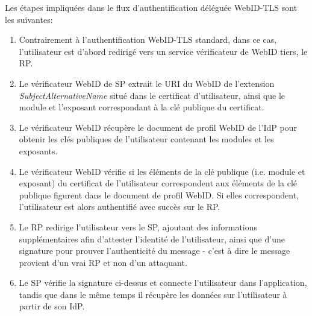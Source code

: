 \documentclass[a4paper]{article}
\begin{document}
Les étapes impliquées dans le flux d'authentification déléguée WebID-TLS sont les suivantes:\\

\begin{enumerate}
\item Contrairement à l'authentification WebID-TLS standard, dans ce cas, l'utilisateur est d'abord redirigé vers un service vérificateur de WebID tiers, le RP.
\item Le vérificateur WebID de SP extrait le URI du WebID de l'extension \textit{SubjectAlternativeName} situé dans le certificat d'utilisateur, ainsi que le module et l'exposant correspondant à la clé publique du certificat.
\item Le vérificateur WebID récupère le document de profil WebID de l'IdP pour obtenir les clés publiques de l'utilisateur contenant les modules et les exposants.
\item Le vérificateur WebID vérifie si les éléments de la clé publique (i.e. module et exposant) du certificat de l'utilisateur correspondent aux éléments de la clé publique figurent dans le document de profil WebID. Si elles correspondent, l'utilisateur est alors authentifié avec succès sur le RP.
\item Le RP redirige l'utilisateur vers le SP, ajoutant des informations supplémentaires afin d'attester l'identité de l'utilisateur, ainsi que d'une signature pour prouver l'authenticité du message - c'est à dire le message provient d'un vrai RP et non d'un attaquant.
\item Le SP vérifie la signature ci-dessus et connecte l'utilisateur dans l'application, tandis que dans le même temps il récupère les données sur l'utilisateur à partir de son IdP.
\end{enumerate}
\end{document}
